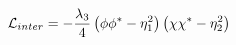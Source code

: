 \begin{equation}
{\cal L}_{inter}=-\frac{\lambda_3}{4}\left(\phi\phi^*-\eta^2_1\right)\left(\chi\chi^*-\eta^2_2\right)
\end{equation}

